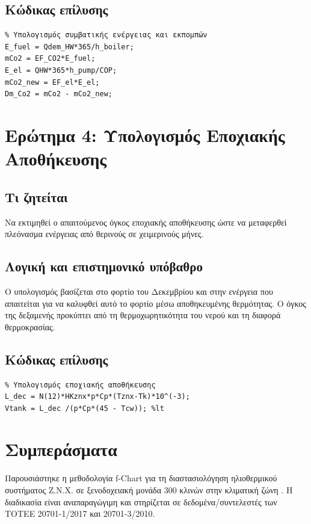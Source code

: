 \documentclass[10pt,a4paper]{article}
\begin{document}
\subsection*{Κώδικας επίλυσης}
\begin{lstlisting}
% Υπολογισμός συμβατικής ενέργειας και εκπομπών
E_fuel = Qdem_HW*365/h_boiler;
mCo2 = EF_CO2*E_fuel;
E_el = QHW*365*h_pump/COP;
mCo2_new = EF_el*E_el;
Dm_Co2 = mCo2 - mCo2_new;
\end{lstlisting}

\section{Ερώτημα 4: Υπολογισμός Εποχιακής Αποθήκευσης}
\subsection*{Τι ζητείται}
Να εκτιμηθεί ο απαιτούμενος όγκος εποχιακής αποθήκευσης ώστε να μεταφερθεί 
πλεόνασμα ενέργειας από θερινούς σε χειμερινούς μήνες.

\subsection*{Λογική και επιστημονικό υπόβαθρο}
Ο υπολογισμός βασίζεται στο φορτίο του Δεκεμβρίου και στην ενέργεια που 
απαιτείται για να καλυφθεί αυτό το φορτίο μέσω αποθηκευμένης θερμότητας. Ο 
όγκος της δεξαμενής προκύπτει από τη θερμοχωρητικότητα του νερού και τη 
διαφορά θερμοκρασίας.

\subsection*{Κώδικας επίλυσης}
\begin{lstlisting}
% Υπολογισμός εποχιακής αποθήκευσης
L_dec = N(12)*HKznx*p*Cp*(Tznx-Tk)*10^(-3);
Vtank = L_dec /(p*Cp*(45 - Tcw)); %lt
\end{lstlisting}

\section{Συμπεράσματα}
Παρουσιάστηκε η μεθοδολογία f-Chart για τη διαστασιολόγηση ηλιοθερμικού 
συστήματος Ζ.Ν.Χ. σε ξενοδοχειακή μονάδα \num{300} κλινών στην κλιματική 
ζώνη \textDelta. Η διαδικασία είναι αναπαραγώγιμη και στηρίζεται σε 
δεδομένα/συντελεστές των ΤΟΤΕΕ 20701-1/2017 και 20701-3/2010.

\appendix
\end{document}
